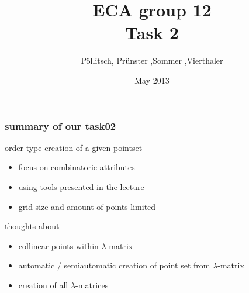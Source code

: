 \documentclass{beamer}
\title{ECA group 12 \\ Task 2}
\author{\small{P\"ollitsch, Pr\"unster ,Sommer ,Vierthaler}}
\date{May 2013}
\begin{document}
\begin{frame}[plain]
	\titlepage
\end{frame}

\begin{frame}
\frametitle{summary of our task02}
order type creation of a given pointset\\
\begin{itemize}
\item focus on combinatoric attributes
\item using tools presented in the lecture
\item grid size and amount of points limited
\end{itemize}
thoughts about \\
\begin{itemize}
\item collinear points within $\lambda$-matrix
\item automatic / semiautomatic creation of point set from $\lambda$-matrix
\item creation of all $\lambda$-matrices
\end{itemize}

\end{frame}
\end{document}
